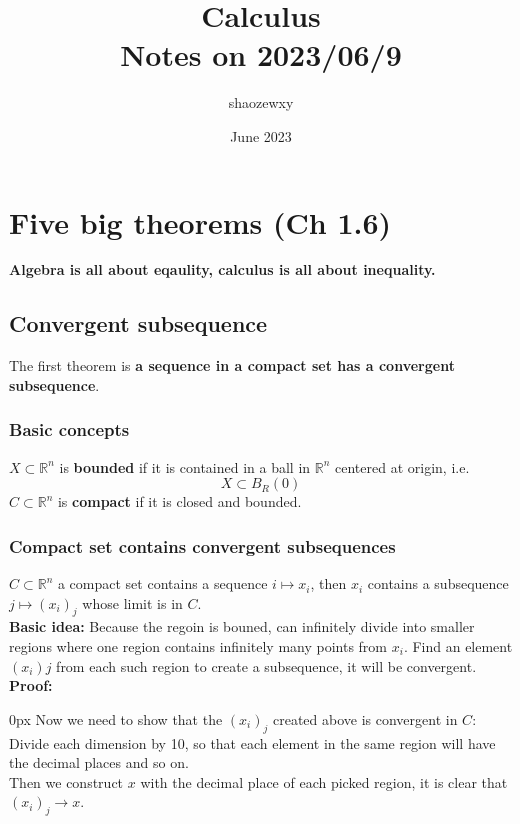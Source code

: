 \documentclass{article}
\title{Calculus\\
\large{Notes on 2023/06/9}}
\author{shaozewxy }
\date{June 2023}
\begin{document}
\maketitle

\section{Five big theorems (Ch 1.6)}
\textbf{Algebra is all about eqaulity, calculus is all about inequality.}
\subsection{Convergent subsequence}
The first theorem is \textbf{a sequence in a compact set has a convergent subsequence}.
\subsubsection{Basic concepts}
$X \subset \mathbb{R}^n$ is \textbf{bounded} if it is contained in a ball in $\mathbb{R}^n$ centered at origin, i.e.
\begin{equation*}
    X \subset B_R(0)
\end{equation*}
$C \subset \mathbb{R}^n$ is \textbf{compact} if it is closed and bounded.
\subsubsection{Compact set contains convergent subsequences}
$C \subset \mathbb{R}^n$ a compact set contains a sequence $i \mapsto x_i$, then $x_i$ contains a subsequence $j \mapsto (x_i)_j$ whose limit is in $C$.\\
\textbf{Basic idea:}
    Because the regoin is bouned, can infinitely divide into smaller regions where one region contains infinitely many points from $x_i$. Find an element $(x_i)j$ from each such region to create a subsequence, it will be convergent.\\
\textbf{Proof:}
\begin{addmargin}[10px]{0px}
    Now we need to show that the $(x_i)_j$ created above is convergent in $C$:\\
    Divide each dimension by 10, so that each element in the same region will have the decimal places and so on.\\
    Then we construct $x$ with the decimal place of each picked region, it is clear that $(x_i)_j \rightarrow x$.
\end{addmargin}
\end{document}
